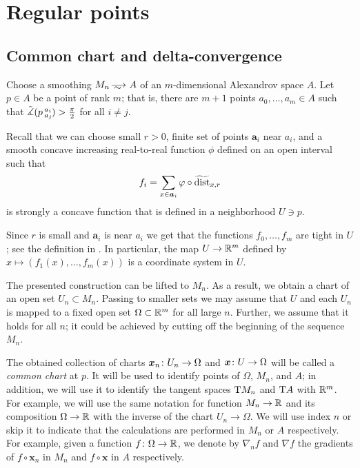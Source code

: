 \section{Regular points}\label{sec:ref}

\subsection{Common chart and delta-convergence}\label{subsec:chart+delta}

Choose a smoothing $M_n\smooths{} A$ of an $m$-dimensional Alexandrov space $A$.
Let $p\in A$ be a point of rank $m$; that is, there are $m+1$ points $a_0,\dots, a_m\in A$ such that 
$\tilde\measuredangle(p\,{}^{a_i}_{a_j}\hspace{-0.2ex})>\tfrac\pi2$ for all $i\ne j$.

Recall \cite[Sec. 7]{petrunin-conc} that we can choose small $r>0$,
finite set of points $\bm{a}_i$ near $a_i$,
and a smooth concave increasing real-to-real function $\phi$ defined on an open interval such that 
\[f_i=\sum_{x\in \bm{a}_i}\varphi\circ\widetilde{\operatorname{\rm dist}}_{x,r}\]
is strongly a concave function that is defined in a neighborhood $U\ni p$.

Since $r$ is small and $\bm{a}_i$ is near $a_i$ we get that the functions $f_0, \dots, f_m$ are tight in $U$; see the definition in \cite{petrunin-conc}.
In particular, the map $U\to\mathbb{R}^m$ defined by $x\mapsto (f_1(x),\dots,f_m(x))$ is a coordinate system in $U$.

The presented construction can be lifted to $M_n$.
As a result, we obtain a chart of an open set $U_n\subset M_n$.
Passing to smaller sets we may assume that $U$ and each $U_n$ is mapped to a fixed open set $\Omega\subset\mathbb{R}^m$ for all large $n$.
Further, we assume that it holds for all $n$; it could be achieved by cutting off the beginning of the sequence $M_n$.

The obtained collection of charts $\bm{x}_n\:U_n\zz\to \Omega$ and $\bm{x}\:U\zz\to \Omega$ will be called a \emph{common chart} at $p$.
It will be used to identify points of $\Omega$, $M_n$, and $A$; 
in addition, we will use it to identify the tangent spaces $\mathrm{T} M_n$ and $\mathrm{T} A$ with $\mathbb{R}^m$.
For example, we will use the same notation for function $M_n\to \mathbb{R}$ and its composition $\Omega\to \mathbb{R}$ with the inverse of the chart $U_n\to \Omega$.
We will use index $n$ or skip it to indicate that the calculations are performed in $M_n$ or $A$ respectively.
For example, given a function $f\colon\Omega\to \mathbb{R}$, we denote by $\nabla_nf$ and $\nabla f$ the gradients of $f\circ \bm{x}_n$ in $M_n$ and $f\circ \bm{x}$ in $A$ respectively.


